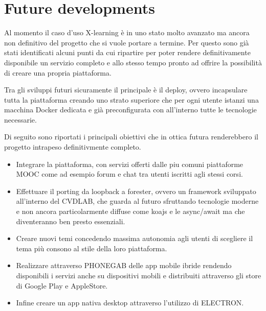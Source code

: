 \section{Future developments}
\label{sec:future_developments}

Al momento il caso d'uso X-learning è in uno stato molto avanzato ma ancora non definitivo del progetto che si vuole portare a termine.
Per questo sono già stati identificati alcuni punti da cui ripartire per poter rendere definitivamente disponibile un servizio completo e allo stesso tempo pronto ad offrire la possibilità di creare una propria piattaforma.

Tra gli sviluppi futuri sicuramente il principale è il deploy, ovvero incapsulare tutta la piattaforma creando uno strato superiore che per ogni utente istanzi una macchina Docker dedicata e già preconfigurata con all'interno tutte le tecnologie necessarie.

Di seguito sono riportati i principali obiettivi che in ottica futura renderebbero il progetto intrapeso definitivmente completo.

\begin{itemize}
  \item Integrare la piattaforma, con servizi offerti dalle piu comuni piattaforme MOOC come ad esempio forum e chat tra utenti iscritti agli stessi corsi.

  \item Effettuare il porting da loopback a forester, ovvero un framework sviluppato all'interno del CVDLAB, che guarda al futuro sfruttando tecnologie moderne e non ancora particolarmente diffuse come koajs e le async/await ma che diventeranno ben presto essenziali. 

  \item Creare nuovi temi concedendo massima autonomia agli utenti di scegliere il tema più consono al stile della loro piattaforma.

  \item Realizzare attraverso PHONEGAB delle app mobile ibride rendendo disponibili i servizi anche su dispositivi mobili e distribuiti attraverso gli store di Google Play e AppleStore.

  \item Infine creare un app nativa desktop attraverso l'utilizzo di ELECTRON.

\end{itemize}